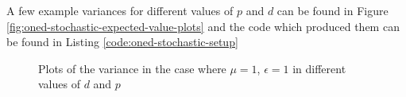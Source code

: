 A few example variances for different values of $p$ and $d$ can be found in
Figure \ref{fig:oned-stochastic-expected-value-plots} and the code which
produced them can be found in Listing \ref{code:oned-stochastic-setup}

\begin{figure}
    \centering
    \begin{subfigure}[b]{0.55\textwidth}
        \centering
    \end{subfigure}
    \begin{subfigure}[b]{0.55\textwidth}
        \centering
    \end{subfigure}
    \caption{Plots of the variance in the case where $\mu=1$, $\epsilon = 1$ in
    different values of $d$ and $p$}
\end{figure}

